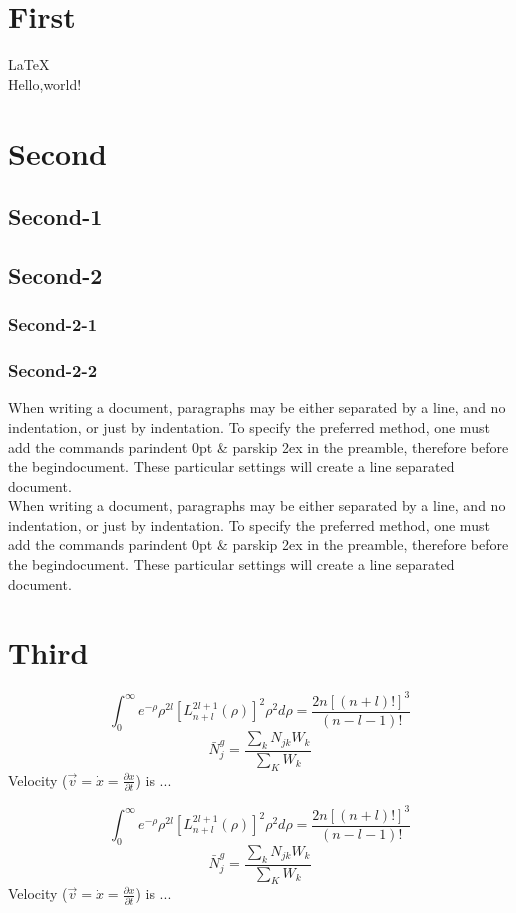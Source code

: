 \documentclass{article}
\begin{document}
\section{First}
\LaTeX\\
Hello,world!
\section{Second}
\subsection{Second-1}
\subsection{Second-2}
\subsubsection{Second-2-1}
\subsubsection{Second-2-2}
When writing a document, paragraphs may be either separated by a line, and
no indentation, or just by indentation. To specify the preferred method, one
must add the commands parindent 0pt \& parskip 2ex in the preamble,
therefore before the begin{document}. These particular settings will create
a line separated document.\\
When writing a document, paragraphs may be either separated by a line, and
no indentation, or just by indentation. To specify the preferred method, one
must add the commands parindent 0pt \& parskip 2ex in the preamble,
therefore before the begin{document}. These particular settings will create
a line separated document.
\section{Third}

    \begin{equation}
        \int_0^{\infty} e^{-\rho} \rho^{2l}\left[ L_{n+l}^{2l+1} \left(\rho \right) \right]^2 \rho^2 d\rho = \frac{2n \left[\left(n+l\right)!  \right]^3}{(n-l-1)!}
    \end{equation}
	\[
		\bar{N}_j^g = \frac{\sum\limits_{k} N_{jk} W_k}{\sum\limits_{K} W_k}
	\]
	Velocity ($\vec{v} = \dot{x} = \frac{\partial x}{\partial t}$) is ...

    \begin{equation}
        \int_0^{\infty} e^{-\rho} \rho^{2l}\left[ L_{n+l}^{2l+1} \left(\rho \right) \right]^2 \rho^2 d\rho = \frac{2n \left[\left(n+l\right)!  \right]^3}{(n-l-1)!}
    \end{equation}
	\[
		\bar{N}_j^g = \frac{\sum\limits_{k} N_{jk} W_k}{\sum\limits_{K} W_k}
	\]
	Velocity ($\vec{v} = \dot{x} = \frac{\partial x}{\partial t}$) is ...
\end{document}
